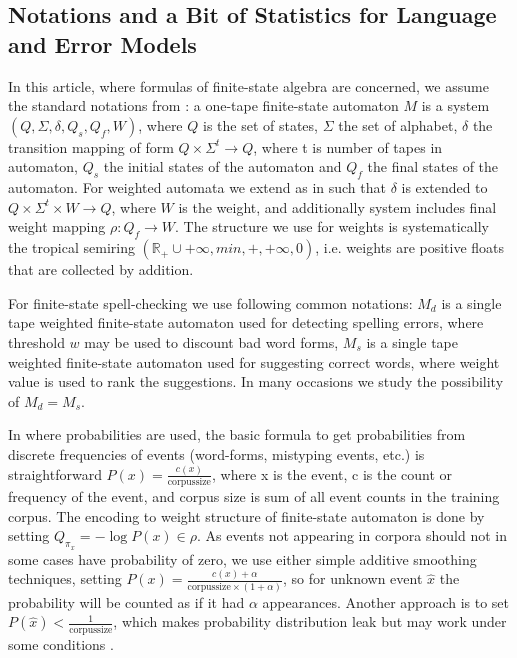 \documentclass[a4paper,12pt]{article}
\begin{document}
\subsection{Notations and a Bit of Statistics for Language and Error Models}
\label{subsec:theory}

In this article, where formulas of finite-state algebra are concerned, we
assume the standard notations from \cite{aho2007compilers}: a one-tape
finite-state automaton $M$ is a system $(Q, \Sigma, \delta, Q_s, Q_f, W)$,
where $Q$ is the set of states, $\Sigma$ the set of alphabet, $\delta$ the
transition mapping of form $Q \times \Sigma^t \rightarrow Q$, where t is number
of tapes in automaton, $Q_s$ the initial states of the automaton and $Q_f$ the
final states of the automaton. For weighted automata we extend as in
\cite{mohri2009weighted} such that $\delta$ is extended to $Q \times \Sigma^t
\times W \rightarrow Q$, where $W$ is the weight, and additionally system
includes final weight mapping $\rho: Q_f \rightarrow W$. The structure we
use for weights is systematically the tropical semiring 
$(\mathbb{R}_+ \cup {+\infty}, min, +, +\infty, 0)$, i.e. weights are positive
floats that are collected by addition.

For finite-state spell-checking we use following common notations: $M_d$ is a
single tape weighted finite-state automaton used for detecting spelling errors,
where threshold $w$ may be used to discount bad word forms, $M_s$ is a single
tape weighted finite-state automaton used for suggesting correct words, where
weight value is used to rank the suggestions. In many occasions we study the
possibility of $M_d = M_s$. 

In where probabilities are used, the basic formula to get probabilities from
discrete frequencies of events (word-forms, mistyping events, etc.) is
straightforward $P(x) = \frac{c(x)}{\mathrm{corpus size}}$, where x is the
event, c is the count or frequency of the event, and corpus size is sum of all
event counts in the training corpus. The encoding to weight structure of
finite-state automaton is done by setting $Q_{\pi_x} = -\log P(x) \in \rho$.
As events not appearing in corpora should not in some cases have probability of
zero, we use either simple additive smoothing techniques, setting $P(x) =
\frac{c(x) + \alpha}{\mathrm{corpus size} \times (1 + \alpha)}$, so for unknown
event $\hat{x}$ the probability will be counted as if it had $\alpha$
appearances.  Another approach is to set $P(\hat{x}) < \frac{1}{\mathrm{corpus
size}}$, which makes probability distribution leak but may work under some
conditions \cite[]{brants2007large}.
\end{document}
